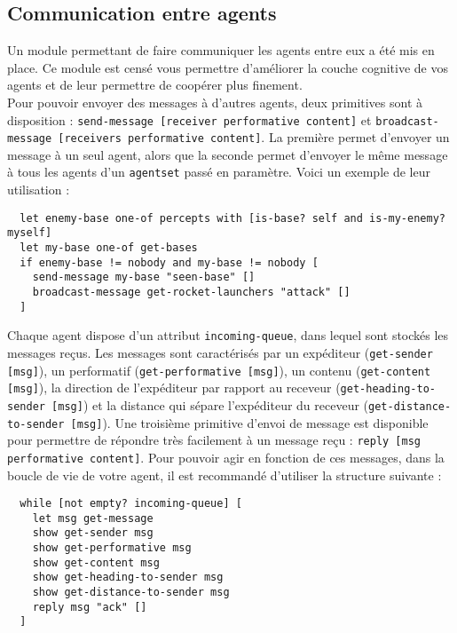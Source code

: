 \documentclass[a4paper,11pt]{article}
\begin{document}
\subsection*{Communication entre agents}

Un module permettant de faire communiquer les agents entre eux a été mis en place. Ce module est
censé vous permettre d'améliorer la couche cognitive de vos agents et de leur permettre de coopérer
plus finement.\\

Pour pouvoir envoyer des messages à d'autres agents, deux primitives sont à disposition :
\texttt{send-message [receiver performative content]} et \texttt{broadcast-message [receivers
performative content]}. La première permet d'envoyer un message à un seul agent, alors que la
seconde permet d'envoyer le même message à tous les agents d'un \texttt{agentset} passé en
paramètre. Voici un exemple de leur utilisation :

\begin{verbatim}
  let enemy-base one-of percepts with [is-base? self and is-my-enemy? myself]
  let my-base one-of get-bases
  if enemy-base != nobody and my-base != nobody [
    send-message my-base "seen-base" [] 
    broadcast-message get-rocket-launchers "attack" [] 
  ]
\end{verbatim}

Chaque agent dispose d'un attribut \texttt{incoming-queue}, dans lequel sont stockés les messages
reçus. Les messages sont caractérisés par un expéditeur (\texttt{get-sender [msg]}), un performatif
(\texttt{get-performative [msg]}), un contenu (\texttt{get-content [msg]}), la direction de
l'expéditeur par rapport au receveur (\texttt{get-heading-to-sender [msg]}) et la distance qui
sépare l'expéditeur du receveur (\texttt{get-distance-to-sender [msg]}). Une troisième primitive
d'envoi de message est disponible pour permettre de répondre très facilement à un message reçu :
\texttt{reply [msg performative content]}. Pour pouvoir agir en fonction de ces messages, dans la
boucle de vie de votre agent, il est recommandé d'utiliser la structure suivante :

\begin{verbatim}
  while [not empty? incoming-queue] [
    let msg get-message
    show get-sender msg
    show get-performative msg
    show get-content msg
    show get-heading-to-sender msg
    show get-distance-to-sender msg
    reply msg "ack" []
  ]
\end{verbatim}
\end{document}
